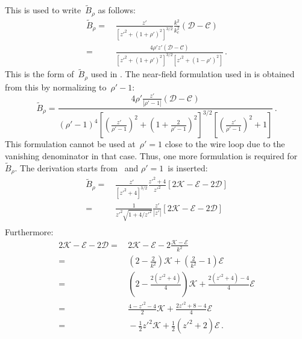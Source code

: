 This is used to write~$\tilde{B}_\rho$ as follows:
\begin{align}
  \tilde{B}_\rho
 =&\, \frac{z'}{\left[ z'^2 + (1 + \rho')^2 \right]^{3/2}} \frac{k^2}{k_c^2} \left(  \mathcal{D} - \mathcal{C} \right) \nonumber \\
 =&\, \frac{4 \rho' z' \left(  \mathcal{D} - \mathcal{C} \right) }{\left[ z'^2 + (1 + \rho')^2 \right]^{3/2} \left[ z'^2 + (1 - \rho')^2 \right]} \label{eqn:cwl_B_rho_f_derivation} \, .
\end{align}
This is the form of~$\tilde{B}_\rho$ used in .
The near-field formulation used in  is obtained from this by normalizing to~$\rho'-1$:
\begin{equation}
  \tilde{B}_\rho
 = \frac{4 \rho' \frac{z'}{|\rho'-1|} \left( \mathcal{D} - \mathcal{C} \right) }
        {(\rho'-1)^4 \left[ \left(\frac{z'}{\rho'-1}\right)^2 + \left(1 + \frac{2}{\rho'-1}\right)^2 \right]^{3/2}
                     \left[ \left(\frac{z'}{\rho'-1}\right)^2 + 1 \right]} \label{eqn:cwl_B_rho_n_derivation} \, .
\end{equation}
This formulation cannot be used at~$\rho'=1$ close to the wire loop
due to the vanishing denominator in that case.
Thus, one more formulation is required for~$\tilde{B}_\rho$.
The derivation starts from~ and $\rho'=1$~is inserted:
\begin{align}
  \tilde{B}_\rho
 =&\, \frac{z'}{\left[ z'^2 + 4 \right]^{3/2}} \frac{z'^2 + 4}{z'^2} \left[ 2 \mathcal{K} - \mathcal{E} - 2 \mathcal{D} \right] \nonumber \\
 =&\, \frac{1}{z'^2 \sqrt{1 + 4/z'^2}} \frac{z'}{|z'|} \left[ 2 \mathcal{K} - \mathcal{E} - 2 \mathcal{D} \right] \nonumber \\
\end{align}
Furthermore:
\begin{align}
      2 \mathcal{K} - \mathcal{E} - 2 \mathcal{D}
 =&\, 2 \mathcal{K} - \mathcal{E} - 2 \frac{\mathcal{K} - \mathcal{E}}{k^2} \nonumber \\
 =&\, \left( 2 - \frac{2}{k^2} \right) \mathcal{K} + \left( \frac{2}{k^2} - 1 \right) \mathcal{E} \nonumber \\
 =&\, \left( 2 - \frac{2(z'^2+4)}{4} \right) \mathcal{K} + \frac{2(z'^2+4) - 4}{4} \mathcal{E} \nonumber \\
 =&\, \frac{4 - z'^2 -4}{2} \mathcal{K} + \frac{2 z'^2 + 8 - 4}{4} \mathcal{E} \nonumber \\
 =&\, -\frac{1}{2} z'^2 \mathcal{K} + \frac{1}{2}\left(z'^2 +2\right) \mathcal{E} \, .
\end{align}
